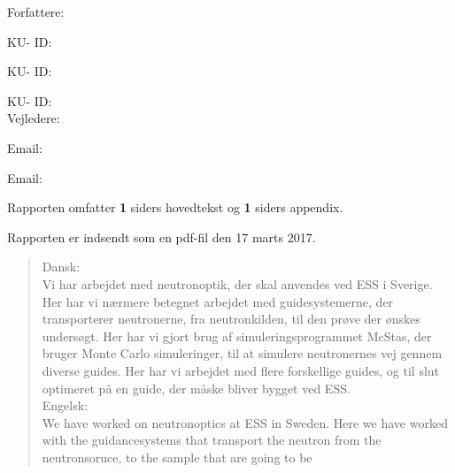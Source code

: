 \documentclass[12pt,oneside,a4paper]{article}
\begin{document}
\vfill
{\large Forfattere:}\\
{\large \hspace*{1cm}   \hspace{1cm} KU- ID:  \\
{\large \hspace*{1cm}    \hspace{1cm} KU- ID:  \\
{\large \hspace*{1cm}    \hspace{1cm} KU- ID:  \\ 
        
{\large Vejledere:}\\
{\large \hspace*{1cm}   \hspace{1cm} Email:  \\
{\large \hspace*{1cm}     \hspace{1cm} Email:  \\

\vfill

{\large Rapporten omfatter {\bf 1} siders hovedtekst og {\bf 1} siders appendix.}

{\large Rapporten er indsendt som en pdf-fil den 17 marts 2017. }

\normalsize

\newpage

\begin{abstract}


Dansk:
\\
Vi har arbejdet med neutronoptik, der skal anvendes ved ESS i Sverige. Her har vi nærmere betegnet arbejdet med guidesystemerne, der transporterer neutronerne, fra neutronkilden, til den prøve der ønskes undersøgt. Her har vi gjort brug af simuleringsprogrammet McStas, der bruger Monte Carlo simuleringer, til at simulere neutronernes vej gennem diverse guides. Her har vi arbejdet med flere forskellige guides, og til slut optimeret på en guide, der måske bliver bygget ved ESS. \\

Engelsk:
\\
We have worked on neutronoptics at ESS in Sweden. Here we have worked with the guidancesystems that transport the neutron from the neutronsoruce, to the sample that are going to be 
\end{abstract}

}}}}}
\end{document}
